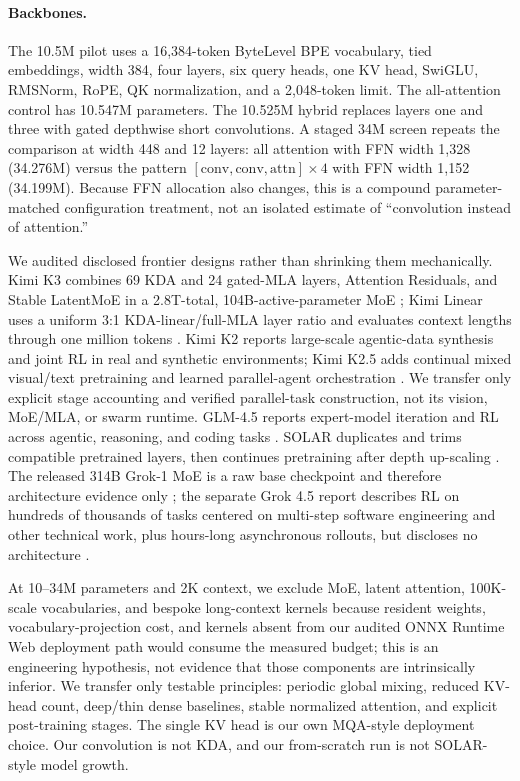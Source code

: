 \documentclass{article}
\begin{document}
\paragraph{Backbones.}
The 10.5M pilot uses a 16,384-token ByteLevel BPE vocabulary, tied embeddings, width 384, four
layers, six query heads, one KV head, SwiGLU, RMSNorm, RoPE, QK normalization, and a 2,048-token
limit.  The all-attention control has 10.547M parameters.  The 10.525M hybrid replaces layers one
and three with gated depthwise short convolutions.  A staged 34M screen repeats the comparison at
width 448 and 12 layers: all attention with FFN width 1,328 (34.276M) versus the pattern
\(\mathrm{[conv,conv,attn]}\times4\) with FFN width 1,152 (34.199M).  Because FFN allocation also
changes, this is a compound parameter-matched configuration treatment, not an isolated estimate
of ``convolution instead of attention.''

We audited disclosed frontier designs rather than shrinking them mechanically.  Kimi K3 combines
69 KDA and 24 gated-MLA layers, Attention Residuals, and Stable LatentMoE in a 2.8T-total,
104B-active-parameter MoE \citep{kimiteam2026k3}; Kimi Linear uses a uniform 3:1
KDA-linear/full-MLA layer ratio and evaluates context lengths through one million tokens
\citep{kimiteam2025linear}.  Kimi K2 reports large-scale agentic-data synthesis and joint RL in
real and synthetic environments; Kimi K2.5 adds continual mixed visual/text pretraining and
learned parallel-agent orchestration \citep{kimiteam2025k2,kimiteam2026k25}.  We transfer only
explicit stage accounting and verified parallel-task construction, not its vision, MoE/MLA, or
swarm runtime.  GLM-4.5 reports expert-model iteration and RL across agentic, reasoning, and
coding tasks \citep{glmteam2025glm45}.  SOLAR duplicates
and trims compatible pretrained layers, then continues pretraining after depth up-scaling
\citep{kim2024solar}.  The released 314B Grok-1 MoE is a raw base checkpoint and therefore
architecture evidence only \citep{xai2024grok}; the separate Grok 4.5 report describes RL on
hundreds of thousands of tasks centered on multi-step software engineering and other technical
work, plus hours-long asynchronous rollouts, but discloses no architecture
\citep{xai2026grok45}.

At 10--34M parameters and 2K context, we exclude MoE, latent attention, 100K-scale vocabularies,
and bespoke long-context kernels because resident weights, vocabulary-projection cost, and kernels
absent from our audited ONNX Runtime Web deployment path would consume the measured budget; this
is an engineering hypothesis, not evidence that those components are intrinsically inferior.
We transfer only testable
principles: periodic global mixing, reduced KV-head count, deep/thin dense baselines, stable
normalized attention, and explicit post-training stages.  The single KV head is our own
MQA-style deployment choice.  Our convolution is not KDA, and our from-scratch run is not
SOLAR-style model growth.
\end{document}
